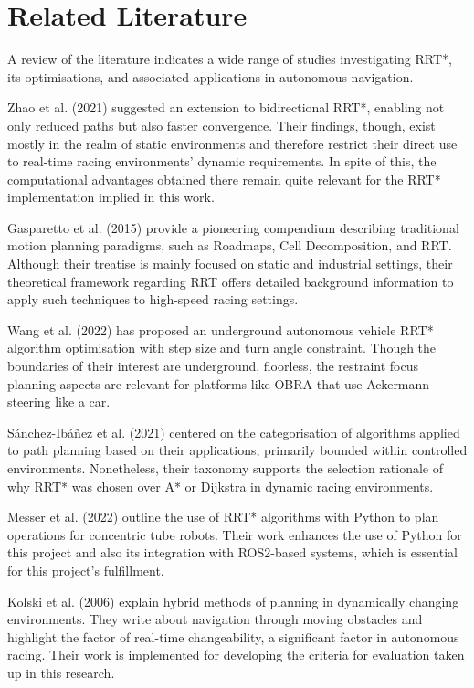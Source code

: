 \documentclass[a4paper,11pt]{report}
\begin{document}
\section{Related Literature}

A review of the literature indicates a wide range of studies investigating RRT*, its optimisations, and associated applications in autonomous navigation.

Zhao et al. (2021) suggested an extension to bidirectional RRT*, enabling not only reduced paths but also faster convergence. Their findings, though, exist mostly in the realm of static environments and therefore restrict their direct use to real-time racing environments' dynamic requirements. In spite of this, the computational advantages obtained there remain quite relevant for the RRT* implementation implied in this work.
\cite{reference5}

Gasparetto et al. (2015) provide a pioneering compendium describing traditional motion planning paradigms, such as Roadmaps, Cell Decomposition, and RRT. Although their treatise is mainly focused on static and industrial settings, their theoretical framework regarding RRT offers detailed background information to apply such techniques to high-speed racing settings. \cite{reference6}

Wang et al. (2022) has proposed an underground autonomous vehicle RRT* algorithm optimisation with step size and turn angle constraint. Though the boundaries of their interest are underground, floorless, the restraint focus planning aspects are relevant for platforms like OBRA that use Ackermann steering like a car.
\cite{reference7}

Sánchez-Ibáñez et al. (2021) centered on the categorisation of algorithms applied to path planning based on their applications, primarily bounded within controlled environments. Nonetheless, their taxonomy supports the selection rationale of why RRT* was chosen over A* or Dijkstra in dynamic racing environments.
\cite{reference8}

Messer et al. (2022) outline the use of RRT* algorithms with Python to plan operations for concentric tube robots. Their work enhances the use of Python for this project and also its integration with ROS2-based systems, which is essential for this project's fulfillment.
\cite{reference9}

Kolski et al. (2006) explain hybrid methods of planning in dynamically changing environments. They write about navigation through moving obstacles and highlight the factor of real-time changeability, a significant factor in autonomous racing. Their work is implemented for developing the criteria for evaluation taken up in this research.
\cite{reference10}
\end{document}
